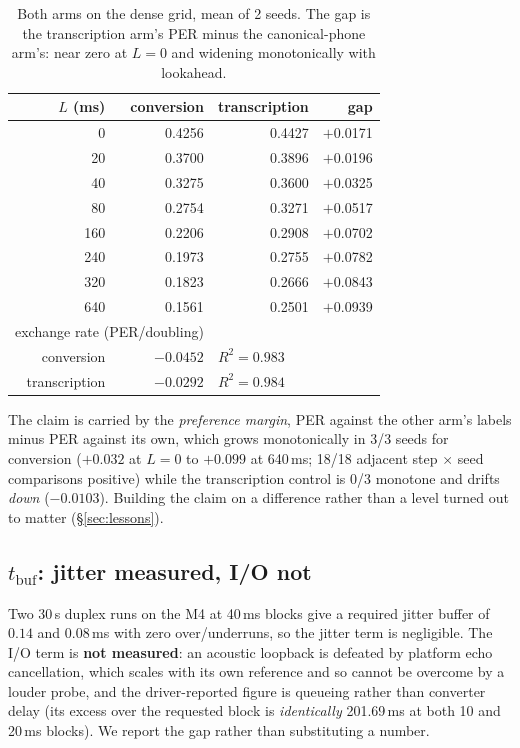 \documentclass{article}
\newcommand{\tbuf}{\ensuremath{t_{\mathrm{buf}}}}
\begin{document}
\begin{table}[t]
\centering\small
\caption{Both arms on the dense grid, mean of 2 seeds. The gap is the
transcription arm's PER minus the canonical-phone arm's: near zero at $L{=}0$ and
widening monotonically with lookahead.}
\label{tab:h3dense}
\begin{tabular}{rrrr}
\toprule
$L$ (ms) & conversion & transcription & gap \\
\midrule
0   & 0.4256 & 0.4427 & $+$0.0171 \\
20  & 0.3700 & 0.3896 & $+$0.0196 \\
40  & 0.3275 & 0.3600 & $+$0.0325 \\
80  & 0.2754 & 0.3271 & $+$0.0517 \\
160 & 0.2206 & 0.2908 & $+$0.0702 \\
240 & 0.1973 & 0.2755 & $+$0.0782 \\
320 & 0.1823 & 0.2666 & $+$0.0843 \\
640 & 0.1561 & 0.2501 & $+$0.0939 \\
\midrule
\multicolumn{2}{l}{exchange rate (PER/doubling)} & & \\
\multicolumn{1}{r}{conversion} & $-0.0452$ & \multicolumn{2}{l}{$R^2=0.983$} \\
\multicolumn{1}{r}{transcription} & $-0.0292$ & \multicolumn{2}{l}{$R^2=0.984$} \\
\bottomrule
\end{tabular}
\end{table}

The claim is carried by the \emph{preference margin}, PER against the other
arm's labels minus PER against its own, which grows monotonically in 3/3
seeds for conversion ($+0.032$ at $L{=}0$ to $+0.099$ at 640\,ms; 18/18
adjacent step $\times$ seed comparisons positive) while the transcription
control is 0/3 monotone and drifts \emph{down} ($-0.0103$). Building the claim
on a difference rather than a level turned out to matter
(\S\ref{sec:lessons}).

\subsection{\tbuf{}: jitter measured, I/O not}

Two 30\,s duplex runs on the M4 at 40\,ms blocks give a required jitter buffer
of $0.14$ and $0.08$\,ms with zero over/underruns, so the jitter term is
negligible. The I/O term is \textbf{not measured}: an acoustic loopback is
defeated by platform echo cancellation, which scales with its own reference and
so cannot be overcome by a louder probe, and the driver-reported figure is
queueing rather than converter delay (its excess over the requested block is
\emph{identically} 201.69\,ms at both 10 and 20\,ms blocks). We report the gap
rather than substituting a number.
\end{document}
